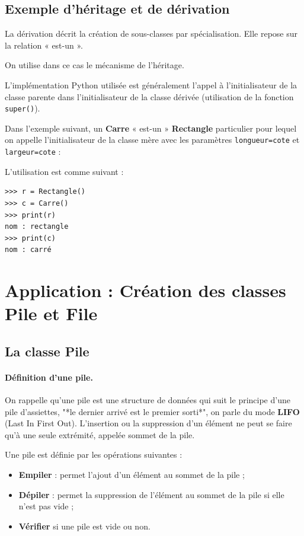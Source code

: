 \documentclass[a4paper,11pt]{article}
\theoremstyle{mytheor}
\begin{document}
\subsection{Exemple d'héritage et de dérivation}

La dérivation décrit la création de sous-classes par spécialisation. Elle repose sur la relation « est-un ».

On utilise dans ce cas le mécanisme de l'héritage.

L'implémentation Python utilisée est généralement l'appel à l'initialisateur de la classe parente dans l'initialisateur de la classe dérivée (utilisation de la fonction \texttt{super()}).

Dans l'exemple suivant, un \textbf{Carre} « est-un » \textbf{Rectangle} particulier pour lequel on appelle l'initialisateur de la classe mère avec les paramètres \texttt{longueur=cote} et \texttt{largeur=cote} :



L'utilisation est comme suivant :

\begin{Verbatim}[frame=leftline, framerule=1.5mm, rulecolor=\color{blue}]
>>> r = Rectangle()
>>> c = Carre()
>>> print(r)
nom : rectangle
>>> print(c)
nom : carré
\end{Verbatim}

\section{Application : Création des classes Pile et File}
\subsection{La classe Pile}
\paragraph{Définition d'une pile.}
On rappelle qu'une pile est une structure de données qui suit le principe d'une pile d'assiettes, "*le dernier arrivé est le premier sorti*", on parle du mode \textbf{LIFO} (Last In First Out). L'insertion ou la suppression d'un élément ne peut se faire qu'à une seule extrémité, appelée sommet de la pile.

Une pile est définie par les opérations suivantes :
\begin{itemize}
	\item \textbf{Empiler} : permet l'ajout d'un élément au sommet de la pile ;
	
	\item \textbf{Dépiler} : permet la suppression de l'élément au sommet de la pile si elle n'est pas vide ;
	
	\item \textbf{Vérifier} si une pile est vide ou non.
\end{itemize}
\end{document}
